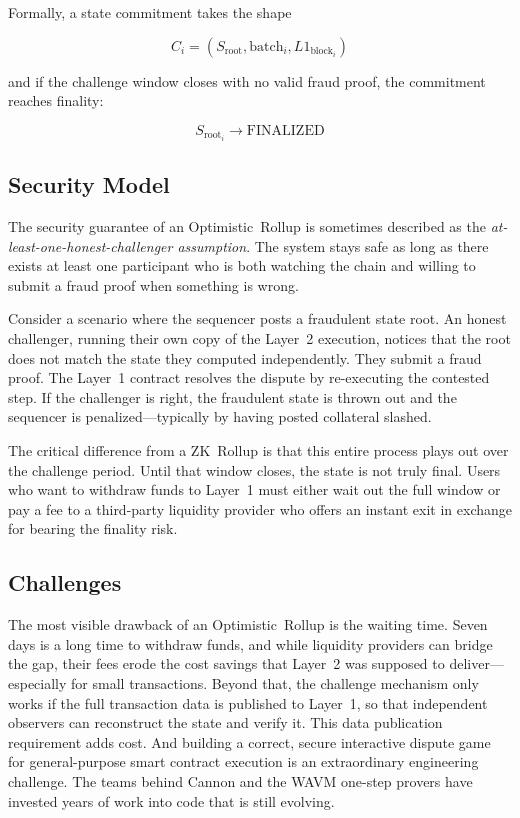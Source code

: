 \documentclass[
]{elteikthesis}[2024/04/26]
\begin{document}
Formally, a state commitment takes the shape

\begin{equation}
C_i = (S_{\text{root}}, \text{batch}_i, L1_{\text{block}_i})
\end{equation}

\noindent and if the challenge window closes with no valid fraud proof, the commitment reaches finality:

\begin{equation}
S_{\text{root}_i} \rightarrow \text{FINALIZED}
\end{equation}

\subsection{Security Model}

The security guarantee of an Optimistic~Rollup is sometimes described as the \textit{at-least-one-honest-challenger assumption}. The system stays safe as long as there exists at least one participant who is both watching the chain and willing to submit a fraud proof when something is wrong.

Consider a scenario where the sequencer posts a fraudulent state root. An honest challenger, running their own copy of the Layer~2 execution, notices that the root does not match the state they computed independently. They submit a fraud proof. The Layer~1 contract resolves the dispute by re-executing the contested step. If the challenger is right, the fraudulent state is thrown out and the sequencer is penalized---typically by having posted collateral slashed.

The critical difference from a ZK~Rollup is that this entire process plays out over the challenge period. Until that window closes, the state is not truly final. Users who want to withdraw funds to Layer~1 must either wait out the full window or pay a fee to a third-party liquidity provider who offers an instant exit in exchange for bearing the finality risk.

\subsection{Challenges}

The most visible drawback of an Optimistic~Rollup is the waiting time. Seven days is a long time to withdraw funds, and while liquidity providers can bridge the gap, their fees erode the cost savings that Layer~2 was supposed to deliver---especially for small transactions. Beyond that, the challenge mechanism only works if the full transaction data is published to Layer~1, so that independent observers can reconstruct the state and verify it. This data publication requirement adds cost. And building a correct, secure interactive dispute game for general-purpose smart contract execution is an extraordinary engineering challenge. The teams behind Cannon and the WAVM one-step provers have invested years of work into code that is still evolving.
\end{document}
